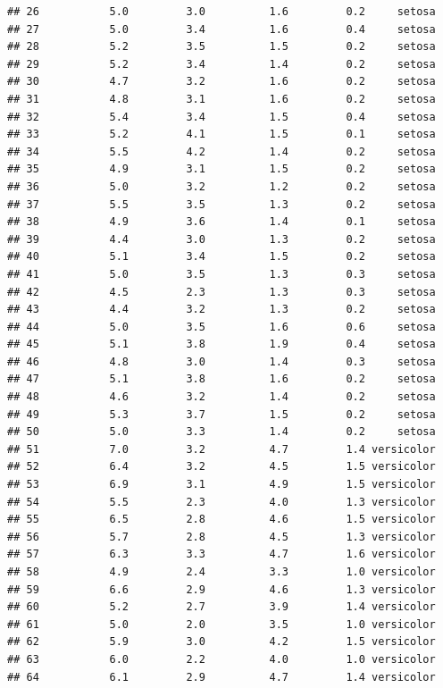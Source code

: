 \documentclass[
]{article}
\begin{document}
\begin{verbatim}
## 26           5.0         3.0          1.6         0.2     setosa
## 27           5.0         3.4          1.6         0.4     setosa
## 28           5.2         3.5          1.5         0.2     setosa
## 29           5.2         3.4          1.4         0.2     setosa
## 30           4.7         3.2          1.6         0.2     setosa
## 31           4.8         3.1          1.6         0.2     setosa
## 32           5.4         3.4          1.5         0.4     setosa
## 33           5.2         4.1          1.5         0.1     setosa
## 34           5.5         4.2          1.4         0.2     setosa
## 35           4.9         3.1          1.5         0.2     setosa
## 36           5.0         3.2          1.2         0.2     setosa
## 37           5.5         3.5          1.3         0.2     setosa
## 38           4.9         3.6          1.4         0.1     setosa
## 39           4.4         3.0          1.3         0.2     setosa
## 40           5.1         3.4          1.5         0.2     setosa
## 41           5.0         3.5          1.3         0.3     setosa
## 42           4.5         2.3          1.3         0.3     setosa
## 43           4.4         3.2          1.3         0.2     setosa
## 44           5.0         3.5          1.6         0.6     setosa
## 45           5.1         3.8          1.9         0.4     setosa
## 46           4.8         3.0          1.4         0.3     setosa
## 47           5.1         3.8          1.6         0.2     setosa
## 48           4.6         3.2          1.4         0.2     setosa
## 49           5.3         3.7          1.5         0.2     setosa
## 50           5.0         3.3          1.4         0.2     setosa
## 51           7.0         3.2          4.7         1.4 versicolor
## 52           6.4         3.2          4.5         1.5 versicolor
## 53           6.9         3.1          4.9         1.5 versicolor
## 54           5.5         2.3          4.0         1.3 versicolor
## 55           6.5         2.8          4.6         1.5 versicolor
## 56           5.7         2.8          4.5         1.3 versicolor
## 57           6.3         3.3          4.7         1.6 versicolor
## 58           4.9         2.4          3.3         1.0 versicolor
## 59           6.6         2.9          4.6         1.3 versicolor
## 60           5.2         2.7          3.9         1.4 versicolor
## 61           5.0         2.0          3.5         1.0 versicolor
## 62           5.9         3.0          4.2         1.5 versicolor
## 63           6.0         2.2          4.0         1.0 versicolor
## 64           6.1         2.9          4.7         1.4 versicolor

\end{verbatim}
\end{document}
